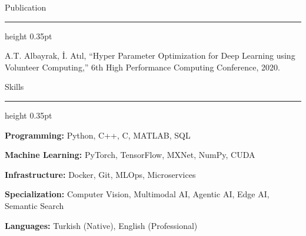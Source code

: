 \documentclass[10pt,a4paper]{article}
\newcommand{\cvsection}[1]{%
  \vspace{0.62em}%
  {\sectionfont\fontsize{13.2}{15}\selectfont #1}\par
  \vspace{0.10em}\hrule height 0.35pt
  \vspace{0.42em}%
}
\begin{document}
\cvsection{Publication}
A.T. Albayrak, İ. Atıl, ``Hyper Parameter Optimization for Deep Learning using Volunteer Computing,'' 6th High Performance Computing Conference, 2020.

\cvsection{Skills}
\textbf{Programming:} Python, C++, C, MATLAB, SQL\par
\vspace{0.22em}
\textbf{Machine Learning:} PyTorch, TensorFlow, MXNet, NumPy, CUDA\par
\vspace{0.22em}
\textbf{Infrastructure:} Docker, Git, MLOps, Microservices\par
\vspace{0.22em}
\textbf{Specialization:} Computer Vision, Multimodal AI, Agentic AI, Edge AI, Semantic Search\par
\vspace{0.22em}
\textbf{Languages:} Turkish (Native), English (Professional)
\end{document}
